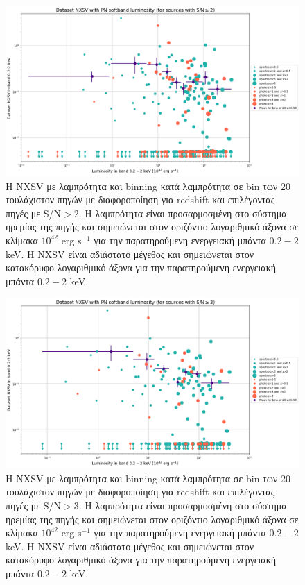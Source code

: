  \begin{figure}  \includegraphics[width=1.12\linewidth]{Figures/NXSVclassic_sn2.png} \caption{ Η \textlatin{NXSV} με λαμπρότητα και \textlatin{binning} κατά λαμπρότητα σε \textlatin{bin} των 20 τουλάχιστον πηγών με διαφοροποίηση για \textlatin{redshift} και επιλέγοντας πηγές με \textlatin{S/N}$>2$. Η λαμπρότητα είναι προσαρμοσμένη στο σύστημα ηρεμίας της πηγής και σημειώνεται στον οριζόντιο λογαριθμικό άξονα σε κλίμακα $10^{42}$ \textlatin{erg s}$^{-1}$ για την παρατηρούμενη ενεργειακή μπάντα $0.2-2$ \textlatin{keV}. Η \textlatin{NXSV} είναι αδιάστατο μέγεθος και σημειώνεται στον κατακόρυφο λογαριθμικό άξονα για την παρατηρούμενη ενεργειακή μπάντα $0.2-2$ \textlatin{keV}.} \label{fig:NXSV_classic_sn2}
    \end{figure}

 \begin{figure}  \includegraphics[width=1.12\linewidth]{Figures/NXSVclassic_sn3.png} \caption{ Η \textlatin{NXSV} με λαμπρότητα και \textlatin{binning} κατά λαμπρότητα σε \textlatin{bin} των 20 τουλάχιστον πηγών με διαφοροποίηση για \textlatin{redshift} και επιλέγοντας πηγές με \textlatin{S/N}$>3$. Η λαμπρότητα είναι προσαρμοσμένη στο σύστημα ηρεμίας της πηγής και σημειώνεται στον οριζόντιο λογαριθμικό άξονα σε κλίμακα $10^{42}$ \textlatin{erg s}$^{-1}$ για την παρατηρούμενη ενεργειακή μπάντα $0.2-2$ \textlatin{keV}. Η \textlatin{NXSV} είναι αδιάστατο μέγεθος και σημειώνεται στον κατακόρυφο λογαριθμικό άξονα για την παρατηρούμενη ενεργειακή μπάντα $0.2-2$ \textlatin{keV}.}  \label{fig:NXSV_classic_sn3}
   \end{figure}


